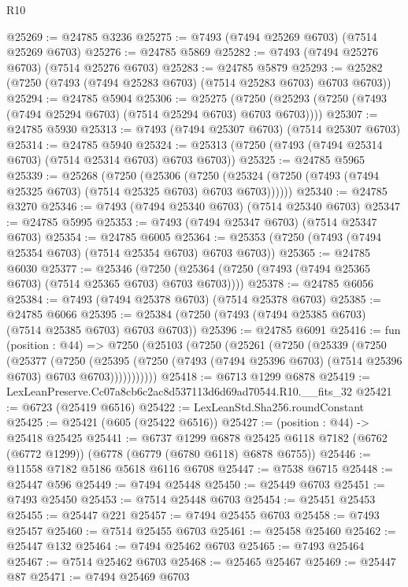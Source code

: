 \begin{lexlean}{R10}
\begin{coremodule}
@25269 := @24785 @3236
@25275 := @7493 (@7494 @25269 @6703) (@7514 @25269 @6703)
@25276 := @24785 @5869
@25282 := @7493 (@7494 @25276 @6703) (@7514 @25276 @6703)
@25283 := @24785 @5879
@25293 := @25282 (@7250 (@7493 (@7494 @25283 @6703) (@7514 @25283 @6703) @6703 @6703))
@25294 := @24785 @5904
@25306 := @25275
    (@7250 (@25293 (@7250 (@7493 (@7494 @25294 @6703) (@7514 @25294 @6703) @6703 @6703))))
@25307 := @24785 @5930
@25313 := @7493 (@7494 @25307 @6703) (@7514 @25307 @6703)
@25314 := @24785 @5940
@25324 := @25313 (@7250 (@7493 (@7494 @25314 @6703) (@7514 @25314 @6703) @6703 @6703))
@25325 := @24785 @5965
@25339 := @25268
    (@7250
      (@25306
        (@7250 (@25324 (@7250 (@7493 (@7494 @25325 @6703) (@7514 @25325 @6703) @6703 @6703))))))
@25340 := @24785 @3270
@25346 := @7493 (@7494 @25340 @6703) (@7514 @25340 @6703)
@25347 := @24785 @5995
@25353 := @7493 (@7494 @25347 @6703) (@7514 @25347 @6703)
@25354 := @24785 @6005
@25364 := @25353 (@7250 (@7493 (@7494 @25354 @6703) (@7514 @25354 @6703) @6703 @6703))
@25365 := @24785 @6030
@25377 := @25346
    (@7250 (@25364 (@7250 (@7493 (@7494 @25365 @6703) (@7514 @25365 @6703) @6703 @6703))))
@25378 := @24785 @6056
@25384 := @7493 (@7494 @25378 @6703) (@7514 @25378 @6703)
@25385 := @24785 @6066
@25395 := @25384 (@7250 (@7493 (@7494 @25385 @6703) (@7514 @25385 @6703) @6703 @6703))
@25396 := @24785 @6091
@25416 := fun (position : @44) =>
  @7250
    (@25103
      (@7250
        (@25261
          (@7250
            (@25339
              (@7250
                (@25377
                  (@7250
                    (@25395
                      (@7250 (@7493 (@7494 @25396 @6703) (@7514 @25396 @6703) @6703 @6703)))))))))))
@25418 := @6713 @1299 @6878
@25419 := LexLeanPreserve.Cc07a8cb6c2ac8d537113d6d69ad70544.R10.__fits_32
@25421 := @6723 (@25419 @6516)
@25422 := LexLeanStd.Sha256.roundConstant
@25425 := @25421 (@605 (@25422 @6516))
@25427 := (position : @44) -> @25418 @25425
@25441 := @6737
    @1299
    @6878
    @25425
    @6118
    @7182
    (@6762 (@6772 @1299))
    (@6778 (@6779 (@6780 @6118) @6878 @6755))
@25446 := @11558 @7182 @5186 @5618 @6116 @6708
@25447 := @7538 @6715
@25448 := @25447 @596
@25449 := @7494 @25448
@25450 := @25449 @6703
@25451 := @7493 @25450
@25453 := @7514 @25448 @6703
@25454 := @25451 @25453
@25455 := @25447 @221
@25457 := @7494 @25455 @6703
@25458 := @7493 @25457
@25460 := @7514 @25455 @6703
@25461 := @25458 @25460
@25462 := @25447 @132
@25464 := @7494 @25462 @6703
@25465 := @7493 @25464
@25467 := @7514 @25462 @6703
@25468 := @25465 @25467
@25469 := @25447 @87
@25471 := @7494 @25469 @6703

\end{coremodule}
\end{lexlean}
